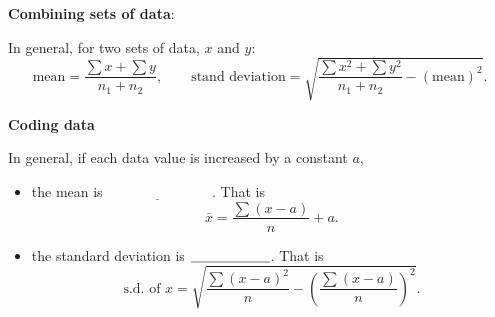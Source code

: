 \newpage



\textbf{Combining sets of data}:
\smallskip

In general, for two sets of data, $x$ and $y$:
\[
\text{mean} = \frac{\sum x + \sum y}{n_1+n_2}, \qquad   \text{stand deviation} = \sqrt{\frac{\sum x^2 + \sum y^2}{n_1+n_2}- (\text{mean})^2}. 
\]


\textbf{Coding data}
\smallskip

In general, if each data value is increased by a constant $a$, 

\begin{itemize}
	\setlength\itemsep{0.8em}
	\item  the mean is  $\underline{\hspace{3cm}}$         .  That is 
	\[
	\bar{x} = \frac{\sum (x-a)}{n} +   a.
	\]
	\item   the standard deviation is $\underline{\hspace{2 cm}}$. That is 
	\[
	\text{s.d. of } x = \sqrt{\frac{\sum (x-a)^2}{n} -  \left(\frac{\sum (x-a)}{n}\right)^2}.  
	\]
\end{itemize}


\exercise   %

